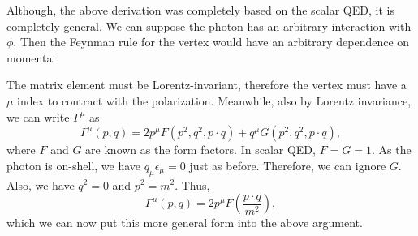 \documentclass[11pt]{article}
\theoremstyle{definition}
\begin{document}
Although, the above derivation was completely based on the scalar QED, it is completely general. We can suppose the photon has an arbitrary interaction with $\phi$. Then the Feynman rule for the vertex would have an arbitrary dependence on momenta:
\begin{center}
\end{center}
The matrix element must be Lorentz-invariant, therefore the vertex must have a $\mu$ index to contract with the polarization. Meanwhile, also by Lorentz invariance, we can write $\Gamma^\mu$ as
\begin{equation}
    \Gamma^\mu (p,q) = 2p^\mu F(p^2,q^2,p\cdot q) + q^\mu G (p^2,q^2,p\cdot q),
\end{equation}
where $F$ and $G$ are known as the form factors. In scalar QED, $F=G=1$. As the photon is on-shell, we have $q_\mu\epsilon_\mu = 0$ just as before. Therefore, we can ignore $G$. Also, we have $q^2=0$ and $p^2 = m^2$. Thus, 
\begin{equation}
    \Gamma^\mu (p,q) = 2p^\mu F\left(\frac{p\cdot q}{m^2}\right),
\end{equation}
which we can now put this more general form into the above argument.
\end{document}
